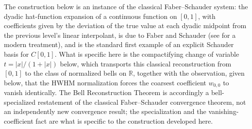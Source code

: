 \documentclass[11pt]{article}
\theoremstyle{definition}
\theoremstyle{plain}
\theoremstyle{remark}
\begin{document}
The construction below is an instance of the classical Faber--Schauder system: the
dyadic hat-function expansion of a continuous function on $[0,1]$, with coefficients
given by the deviation of the true value at each dyadic midpoint from the previous
level's linear interpolant, is due to Faber \cite{Faber1910} and Schauder
\cite{Schauder1927} (see \cite{Semadeni1982} for a modern treatment), and is the
standard first example of an explicit Schauder basis for $C[0,1]$. What is specific
here is the compactifying change of variable $t=|x|/(1+|x|)$ below, which transports
this classical reconstruction from $[0,1]$ to the class of normalized bells on
$\mathbb{R}$, together with the observation, given below, that the HWHM normalization
forces the coarsest coefficient $w_{0,0}$ to vanish identically. The Bell
Reconstruction Theorem is accordingly a bell-specialized restatement of the classical
Faber--Schauder convergence theorem, not an independently new convergence result; the
specialization and the vanishing-coefficient fact are what is specific to the
construction developed here.
\end{document}
